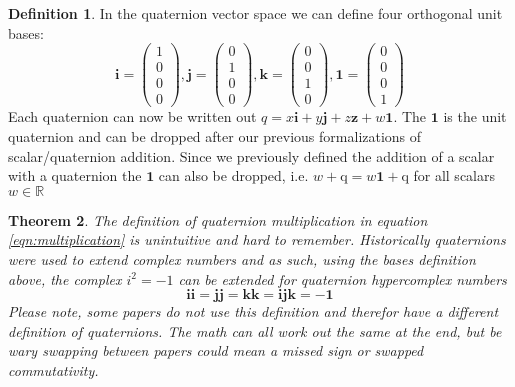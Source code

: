 \documentclass{amsart}
\newtheorem{theorem}{Theorem}[section]
\theoremstyle{definition}
\newtheorem{definition}[theorem]{Definition}
\theoremstyle{remark}
\numberwithin{equation}{section}
\begin{document}
\begin{definition}
  In the quaternion vector space we can define four orthogonal unit bases:
  \begin{equation}
    \mathbf{i} =
    \begin{pmatrix}
      1 \\
      0 \\
      0 \\
      0
    \end{pmatrix},
    \mathbf{j} =
    \begin{pmatrix}
      0 \\
      1 \\
      0 \\
      0
    \end{pmatrix}, 
    \mathbf{k} =
    \begin{pmatrix}
      0 \\
      0 \\
      1 \\
      0
    \end{pmatrix}, 
    \mathbf{1} =
    \begin{pmatrix}
      0 \\
      0 \\
      0 \\
      1
    \end{pmatrix}
  \end{equation}
  Each quaternion can now be written out $q = x \mathbf{i} + y \mathbf{j} + z \mathbf{z} + w \mathbf{1}$. The $\mathbf{1}$ is the unit quaternion and can be dropped after our previous formalizations of scalar/quaternion addition. Since we previously defined the addition of a scalar with a quaternion the $\mathbf{1}$ can also be dropped, i.e. $w+\mathrm{q} = w\mathbf{1} +\mathrm{q}$ for all scalars $w\in\mathbb{R}$
\end{definition}

\begin{theorem}
  The definition of quaternion multiplication in equation \ref{eqn:multiplication} is unintuitive and hard to remember. Historically quaternions were used to extend complex numbers and as such, using the bases definition above, the complex $i^2=-1$ can be extended for quaternion hypercomplex numbers
  \begin{equation}
    \mathbf{ii} = \mathbf{jj} = \mathbf{kk} = \mathbf{ijk} = -\mathbf{1}
  \end{equation}
  Please note, some papers do not use this definition and therefor have a different definition of quaternions. The math can all work out the same at the end, but be wary swapping between papers could mean a missed sign or swapped commutativity.
\end{theorem}
\end{document}

